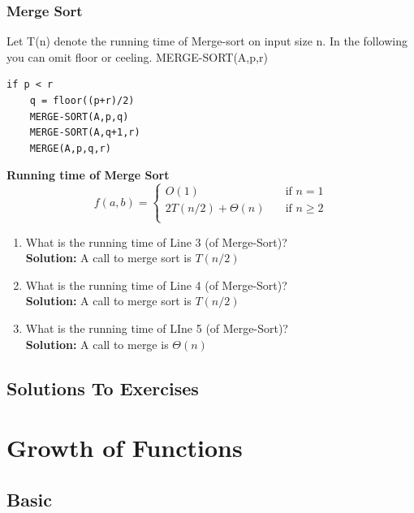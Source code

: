 \documentclass[11pt,fleqn]{book}
\begin{document}
\subsection{Merge Sort} 
\begin{example}
Let T(n) denote the running time of Merge-sort on input size n. In the following you can omit floor or ceeling. 
MERGE-SORT(A,p,r)
\begin{lstlisting}
if p < r 
    q = floor((p+r)/2)
    MERGE-SORT(A,p,q)
    MERGE-SORT(A,q+1,r)
    MERGE(A,p,q,r)
\end{lstlisting}
\end{example}
\begin{remark}
\textbf{Running time of Merge Sort} 
\[
f(a,b) = 
     \begin{cases}
       O(1) &\quad\text{if } n = 1\\
       2T(n/2) + \Theta(n) &\quad\text{if }  n \geq 2 \\
     \end{cases}
\]
\end{remark}
\begin{enumerate}
    \item What is the running time of Line 3 (of Merge-Sort)? \\
    \textbf{Solution:} A call to merge sort is $T(n/2)$
    \item What is the running time of Line 4 (of Merge-Sort)?\\
     \textbf{Solution:} A call to merge sort is $T(n/2)$
    \item What is the running time of LIne 5 (of Merge-Sort)?\\
     \textbf{Solution:} A call to merge is $\Theta(n)$
\end{enumerate}
\section{Solutions To Exercises}

\chapter{ Growth of Functions}

\section{Basic}
\end{document}
